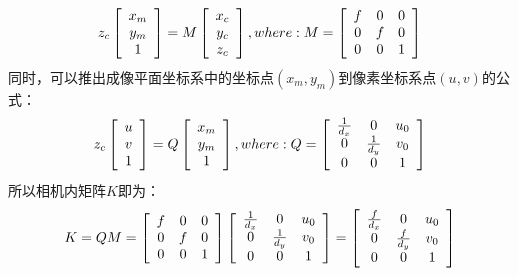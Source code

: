 \documentclass[UTF8]{ctexart}
\begin{document}
\begin{align}
 z_c \left[ \begin{array}{c}  x_m \\ y_m \\ 1 \end{array} \right] =
 M \left[ \begin{array}{c}   x_c \\  y_c \\  z_c  \end{array}\right], where: 
 M = \left [ \begin{array}{ c c c}
f & 0   & 0 \\
0  & f & 0 \\
0  & 0   & 1 \\
\end{array} \right ]
\end{align}
同时，可以推出成像平面坐标系中的坐标点$(x_m,y_m)$到像素坐标系点$(u,v)$的公式：
\begin{align}
z_c \left[ \begin{array}{c}  u \\ v \\ 1 \end{array} \right] =
 Q \left[ \begin{array}{c}   x_m \\  y_m \\  1  \end{array}\right], where:
Q = \left [ \begin{array}{ c c c}
\frac{1}{d_x} & 0   & u_0 \\
0  & \frac{1}{d_y} & v_0 \\
0  & 0   & 1 \\
\end{array} \right ]
\end{align}
所以相机内矩阵$K$即为：
\begin{align}
K = QM= 
\left [ \begin{array}{ c c c}
f & 0   & 0 \\
0  & f & 0 \\
0  & 0   & 1 \\
\end{array} \right ]
\left [ \begin{array}{ c c c}
\frac{1}{d_x} & 0   & u_0 \\
0  & \frac{1}{d_y} & v_0 \\
0  & 0   & 1 \\
\end{array} \right ]
=
\left [ \begin{array}{ c c c}
\frac{f}{d_x} & 0   & u_0 \\
0  & \frac{f}{d_y} & v_0 \\
0  & 0   & 1 \\
\end{array} \right ]
\end{align}
\end{document}
